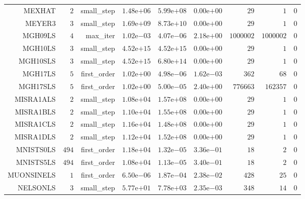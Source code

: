 \begin{longtable}{rrrrrrrrr}
MEXHAT & \(     2\) & small\_step & \( 1.48\)e\(+06\) & \( 5.99\)e\(+08\) & \( 0.00\)e\(+00\) & \(    29\) & \(     1\) & \(     0\) \\
MEYER3 & \(     3\) & small\_step & \( 1.69\)e\(+09\) & \( 8.73\)e\(+10\) & \( 0.00\)e\(+00\) & \(    29\) & \(     1\) & \(     0\) \\
MGH09LS & \(     4\) & max\_iter & \( 1.02\)e\(-03\) & \( 4.07\)e\(-06\) & \( 2.18\)e\(+00\) & \(1000002\) & \(1000002\) & \(     0\) \\
MGH10LS & \(     3\) & small\_step & \( 4.52\)e\(+15\) & \( 4.52\)e\(+15\) & \( 0.00\)e\(+00\) & \(    29\) & \(     1\) & \(     0\) \\
MGH10SLS & \(     3\) & small\_step & \( 4.52\)e\(+15\) & \( 6.80\)e\(+14\) & \( 0.00\)e\(+00\) & \(    29\) & \(     1\) & \(     0\) \\
MGH17LS & \(     5\) & first\_order & \( 1.02\)e\(+00\) & \( 4.98\)e\(-06\) & \( 1.62\)e\(-03\) & \(   362\) & \(    68\) & \(     0\) \\
MGH17SLS & \(     5\) & first\_order & \( 1.02\)e\(+00\) & \( 5.00\)e\(-05\) & \( 2.40\)e\(+00\) & \(776663\) & \(162357\) & \(     0\) \\
MISRA1ALS & \(     2\) & small\_step & \( 1.08\)e\(+04\) & \( 1.57\)e\(+08\) & \( 0.00\)e\(+00\) & \(    29\) & \(     1\) & \(     0\) \\
MISRA1BLS & \(     2\) & small\_step & \( 1.10\)e\(+04\) & \( 1.55\)e\(+08\) & \( 0.00\)e\(+00\) & \(    29\) & \(     1\) & \(     0\) \\
MISRA1CLS & \(     2\) & small\_step & \( 1.16\)e\(+04\) & \( 1.48\)e\(+08\) & \( 0.00\)e\(+00\) & \(    29\) & \(     1\) & \(     0\) \\
MISRA1DLS & \(     2\) & small\_step & \( 1.12\)e\(+04\) & \( 1.52\)e\(+08\) & \( 0.00\)e\(+00\) & \(    29\) & \(     1\) & \(     0\) \\
MNISTS0LS & \(   494\) & first\_order & \( 1.18\)e\(+04\) & \( 1.32\)e\(-05\) & \( 3.36\)e\(-01\) & \(    18\) & \(     2\) & \(     0\) \\
MNISTS5LS & \(   494\) & first\_order & \( 1.08\)e\(+04\) & \( 1.13\)e\(-05\) & \( 3.40\)e\(-01\) & \(    18\) & \(     2\) & \(     0\) \\
MUONSINELS & \(     1\) & first\_order & \( 6.50\)e\(-06\) & \( 1.87\)e\(-04\) & \( 2.38\)e\(-02\) & \(   428\) & \(    25\) & \(     0\) \\
NELSONLS & \(     3\) & small\_step & \( 5.77\)e\(+01\) & \( 7.78\)e\(+03\) & \( 2.35\)e\(-03\) & \(   348\) & \(    14\) & \(     0\) \\

\end{longtable}

